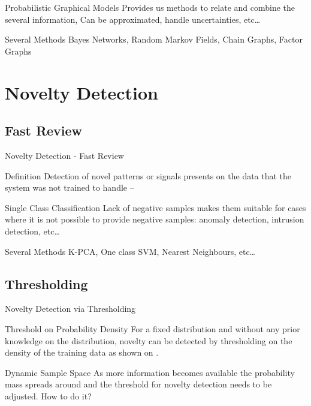 \documentclass[compress]{beamer}
\begin{document}
\begin{frame}{Probabilistic Graphical Models}
Provides us methods to relate and combine the several information,
Can be approximated, handle uncertainties, etc\dots

\begin{block}{Several Methods}
Bayes Networks, Random Markov Fields, Chain Graphs, Factor Graphs
\end{block}

\end{frame}


\section{Novelty Detection}

\subsection{Fast Review}
\begin{frame}{Novelty Detection - Fast Review}
  \begin{block}{Definition}
    Detection of novel patterns or signals presents on the data that the system was not trained
    to handle -- \cite{markou2003novelty}
  \end{block}
  \begin{block}{Single Class Classification}
    Lack of negative samples makes them suitable for cases where it is not possible to
    provide negative samples: anomaly detection, intrusion detection, etc\dots
  \end{block}
  \begin{block}{Several Methods}
    K-PCA, One class SVM, Nearest Neighbours, etc\dots
  \end{block}
\end{frame}

\subsection{Thresholding}
\begin{frame}{Novelty Detection via Thresholding}

\begin{block}{Threshold on Probability Density}
For a fixed distribution and without any prior knowledge on the distribution,
novelty can be detected by thresholding on the density of
the training data as shown on \cite{bishop1994novelty}.
\end{block}

\begin{block}{Dynamic Sample Space}
As more information becomes available the probability mass spreads around and
the threshold for novelty detection needs to be adjusted.
\alert<2->{How to do it?}
\end{block}
\end{frame}
\end{document}
